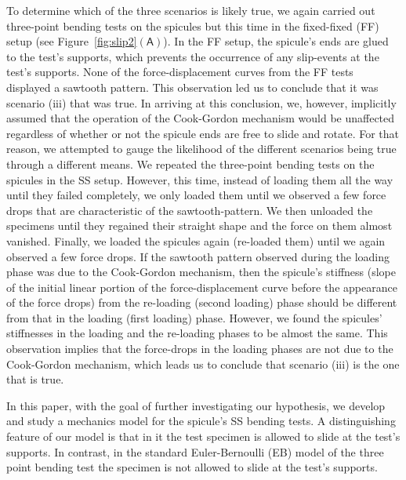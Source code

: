 \documentclass[preprint,10pt,times]{elsarticle}
\numberwithin{equation}{section}
\newcommand{\pr}[1]{\left( #1 \right)}
\newcommand{\subf}[1]{\pr{\textsf{#1}}}
\begin{document}
To determine which of the three scenarios is likely true, we again
carried out three-point bending tests on the spicules but this time
in the fixed-fixed (FF) setup (see Figure~\ref{fig:slip2}$\subf{A}$).
In the FF setup, the spicule's ends are glued to the test's supports,
which prevents the occurrence of any slip-events at the test's supports.
None of the force-displacement curves from the FF tests displayed
a sawtooth pattern. This observation led us to conclude that it was
scenario (iii) that was true. In arriving at this conclusion, we,
however, implicitly assumed that the operation of the Cook-Gordon
mechanism would be unaffected regardless of whether or not the spicule
ends are free to slide and rotate. For that reason, we attempted to
gauge the likelihood of the different scenarios being true through
a different means. We repeated the three-point bending tests on the
spicules in the SS setup. However, this time, instead of loading them
all the way until they failed completely, we only loaded them until
we observed a few force drops that are characteristic of the sawtooth-pattern.
We then unloaded the specimens until they regained their straight
shape and the force on them almost vanished. Finally, we loaded the
spicules again (re-loaded them) until we again observed a few force
drops. If the sawtooth pattern observed during the loading phase was
due to the Cook-Gordon mechanism, then the spicule's stiffness (slope
of the initial linear portion of the force-displacement curve before
the appearance of the force drops) from the re-loading (second loading)
phase should be different from that in the loading (first loading)
phase. However, we found the spicules' stiffnesses in the loading
and the re-loading phases to be almost the same. This observation
implies that the force-drops in the loading phases are not due to
the Cook-Gordon mechanism, which leads us to conclude that scenario (iii)
is the one that is true.

In this paper, with the goal of further investigating our hypothesis,
we develop and study a mechanics model for the spicule's SS bending
tests. A distinguishing feature of our model is that in it the test
specimen is allowed to slide at the test's supports. In contrast,
in the standard Euler-Bernoulli (EB) model of the three point bending
test the specimen is not allowed to slide at the test's supports.

\medskip{}
\end{document}
